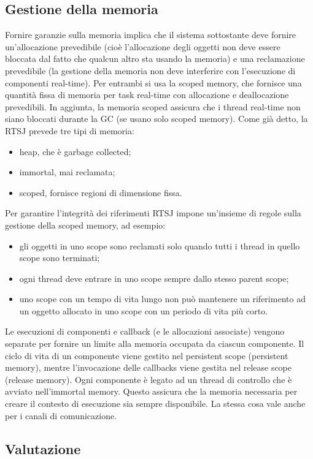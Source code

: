 \subsection{Gestione della memoria}
Fornire garanzie sulla memoria implica che il sistema sottostante deve fornire un'allocazione prevedibile (cioè l'allocazione degli oggetti non deve essere bloccata dal fatto che qualcun altro sta usando la memoria) e una reclamazione prevedibile (la gestione della memoria non deve interferire con l'esecuzione di componenti real-time). Per entrambi si usa la scoped memory, che fornisce una quantità fissa di memoria per task real-time con allocazione e deallocazione prevedibili. In aggiunta, la memoria scoped assicura che i thread real-time non siano bloccati durante la GC (se usano solo scoped memory). Come già detto, la RTSJ prevede tre tipi di memoria: 
\begin{itemize}
	\item heap, che è garbage collected;
	\item immortal, mai reclamata;
	\item scoped, fornisce regioni di dimensione fissa.
\end{itemize}
Per garantire l'integrità dei riferimenti RTSJ impone un'insieme di regole sulla gestione della scoped memory, ad esempio:
\begin{itemize}
	\item gli oggetti in uno scope sono reclamati solo quando tutti i thread in quello scope sono terminati;
	\item ogni thread deve entrare in uno scope sempre dallo stesso parent scope;
	\item uno scope con un tempo di vita lungo non può mantenere un riferimento ad un oggetto allocato in uno scope con un periodo di vita più corto. 
\end{itemize}

Le esecuzioni di componenti e callback (e le allocazioni associate) vengono separate per fornire un limite alla memoria occupata da ciascun componente. Il ciclo di vita di un componente viene gestito nel persistent scope (persistent memory), mentre l'invocazione delle callbacks viene gestita nel release scope (release memory). Ogni componente è legato ad un thread di controllo che è avviato nell'immortal memory. Questo assicura che la memoria necessaria per creare il contesto di esecuzione sia sempre disponibile. La stessa cosa vale anche per i canali di comunicazione.

\subsection{Valutazione}
